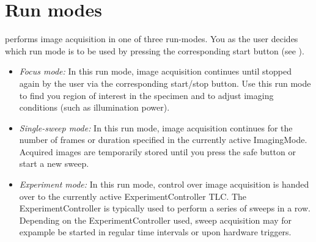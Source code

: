 \section{Run modes}\label{sec:using_runModes}
\HS performs image acquisition in one of three run-modes. You as the user decides which run mode is to be used by pressing the corresponding start button (see ).
\begin{itemize}
	\item \textit{Focus mode:} In this run mode, image acquisition continues until stopped again by the user via the corresponding start/stop button. Use this run mode to find you region of interest in the specimen and to adjust imaging conditions (such as illumination power).
	\item \textit{Single-sweep mode:} In this run mode, image acquisition continues for the number of frames or duration specified in the currently active ImagingMode. Acquired images are temporarily stored until you press the safe button or start a new sweep.
	\item \textit{Experiment mode:} In this run mode, control over image acquisition is handed over to the currently active ExperimentController \ac{TLC}. The ExperimentController is typically used to perform a series of sweeps in a row. Depending on the ExperimentController used, sweep acquisition may for expample be started in regular time intervals or upon hardware triggers. 
\end{itemize}
